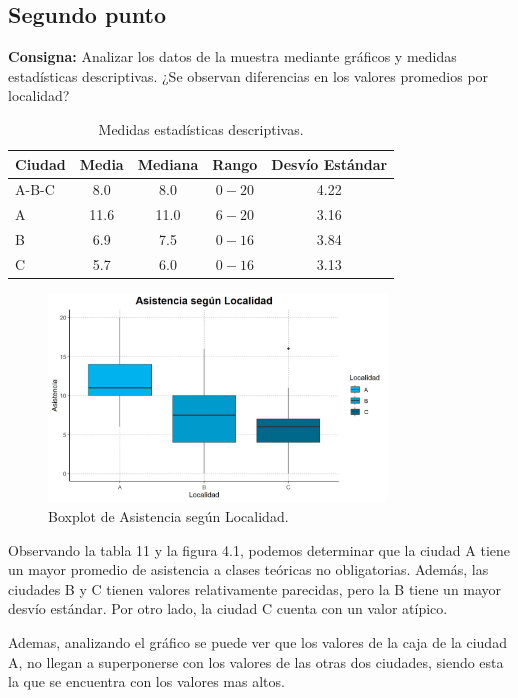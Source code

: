 \documentclass{article} %
\begin{document}
\subsection{Segundo punto}

\textbf{Consigna:} Analizar los datos de la muestra mediante gráficos y medidas estadísticas descriptivas. ¿Se observan diferencias en los valores promedios por localidad?

\begin{table}[H]
	\centering
		\begin{tabular}{||l || c | c | c | c ||}
			\hline
			\hline
			Ciudad & Media & Mediana & Rango & Desvío Estándar\\
			\hline			
			\hline
			A-B-C & 8.0 & 8.0 & $0-20$ & 4.22\\
			\hline
			A & 11.6 & 11.0 & $6-20$ & 3.16\\
			\hline
			B & 6.9 & 7.5 & $0-16$ & 3.84\\
			\hline
			C & 5.7 & 6.0 & $0-16$ & 3.13\\
			\hline
			\hline
		\end{tabular}
		\caption{Medidas estadísticas descriptivas.}
	\label{tab:table-punto-4-2}
\end{table}

\begin{figure}[H]
	\centering
	\includegraphics[width=0.8\textwidth]{images/4-2 box}
	\caption{Boxplot de Asistencia según Localidad.}
	\label{fig:box3}
\end{figure}

Observando la tabla 11 y la figura 4.1, podemos determinar que la ciudad A tiene un mayor promedio de asistencia a clases teóricas no obligatorias. Además, las ciudades B y C tienen valores relativamente parecidas, pero la B tiene un mayor desvío estándar. Por otro lado, la ciudad C cuenta con un valor atípico.

Ademas, analizando el gráfico se puede ver que los valores de la caja de la ciudad A, no llegan a superponerse con los valores de las otras dos ciudades, siendo esta la que se encuentra con los valores mas altos.
\end{document}
